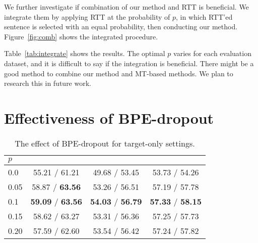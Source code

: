 \documentclass[11pt]{article}
\begin{document}
We further investigate if combination of our method and RTT is beneficial.
We integrate them by applying RTT at the probability of $p$, in which RTT'ed sentence is selected with an equal probability, then conducting our method.
Figure~\ref{fig:comb} shows the integrated procedure.

Table~\ref{tab:integrate} shows the results.
The optimal $p$ varies for each evaluation dataset, and it is difficult to say if the integration is beneficial.
There might be a good method to combine our method and MT-based methods.
We plan to research this in future work.

\section{Effectiveness of BPE-dropout}

\begin{table}[t]
	\scriptsize
	\centering
	\tabcolsep 4pt
	\begin{tabular}{lccc}
		\hline
		$p$
		& \hspace{-1em}{$\def\arraystretch{0.5}\begin{array}{c}\vspace{-0.5em}\\\text{BEA-19}\\\text{test}\\\end{array}$}\hspace{-1em}
		& \hspace{-1em}{$\def\arraystretch{0.5}\begin{array}{c}\vspace{-0.5em}\\\text{CoNLL}\\\text{14}\\\end{array}$}\hspace{-1em}
		& \hspace{-1em}{$\def\arraystretch{0.5}\begin{array}{c}\vspace{-0.5em}\\\text{JFLEG}\\\text{test}\\\end{array}$}\hspace{-1em}
		\\ \hline
		0.0
		& 55.21 / 61.21
		& 49.68 / 53.45
		& 53.73 / 54.26 \\
		0.05
		& 58.87 / \textbf{63.56}
		& 53.26 / 56.51
		& 57.19 / 57.78 \\
		0.1
		& \textbf{59.09} / \textbf{63.56}
		& \textbf{54.03} / \textbf{56.79}
		& \textbf{57.33} / \textbf{58.15} \\
		0.15
		& 58.62 / 63.27
		& 53.31 / 56.36
		& 57.25 / 57.73 \\
		0.20
		& 57.59 / 62.60
		& 53.54 / 56.42
		& 57.24 / 57.82 \\
		\hline
	\end{tabular}
	\caption{The effect of BPE-dropout for target-only settings.}
	\label{tab:drop1}
\end{table}
\end{document}
